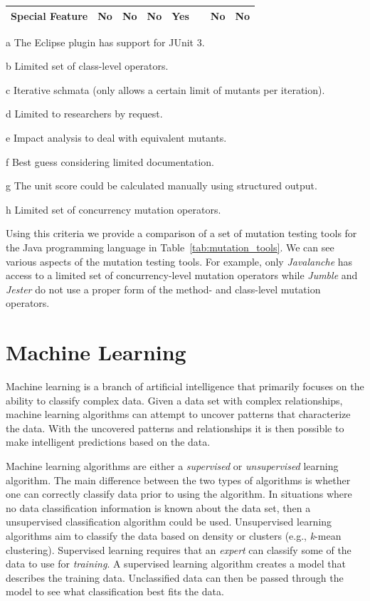\begin{table}
\begin{threeparttable}
\begin{tabular}{|l|l|l|l|l|l|l|}
      \hline \cellcolor[RGB]{169,196,223} \textbf{Special Feature} & No & No & No & Yes~\tnote{e}~\tnote{h} & No & No \\
      \hline
    \end{tabular}
    \begin{tablenotes}
      \item[a] The Eclipse plugin has support for JUnit 3.
      \item[b] Limited set of class-level operators.
      \item[c] Iterative schmata (only allows a certain limit of mutants per iteration).
      \item[d] Limited to researchers by request.
      \item[e] Impact analysis to deal with equivalent mutants.
      \item[f] Best guess considering limited documentation.
      \item[g] The unit score could be calculated manually using structured output.
      \item[h] Limited set of concurrency mutation operators.
    \end{tablenotes}
  \end{threeparttable}
\end{table}
\afterpage\clearpage

Using this criteria we provide a comparison of a set of mutation testing tools for the Java programming language in Table~\ref{tab:mutation_tools}. We can see various aspects of the mutation testing tools. For example, only \emph{Javalanche} has access to a limited set of concurrency-level mutation operators while \emph{Jumble} and \emph{Jester} do not use a proper form of the method- and class-level mutation operators.


\section{Machine Learning}
\label{sec:background_machine_learning}
Machine learning is a branch of artificial intelligence that primarily focuses on the ability to classify complex data. Given a data set with complex relationships, machine learning algorithms can attempt to uncover patterns that characterize the data. With the uncovered patterns and relationships it is then possible to make intelligent predictions based on the data.

Machine learning algorithms are either a \emph{supervised} or \emph{unsupervised} learning algorithm. The main difference between the two types of algorithms is whether one can correctly classify data prior to using the algorithm. In situations where no data classification information is known about the data set, then a unsupervised classification algorithm could be used. Unsupervised learning algorithms aim to classify the data based on density or clusters (e.g., \emph{k}-mean clustering). Supervised learning requires that an \emph{expert} can classify some of the data to use for \emph{training}. A supervised learning algorithm creates a model that describes the training data. Unclassified data can then be passed through the model to see what classification best fits the data.

